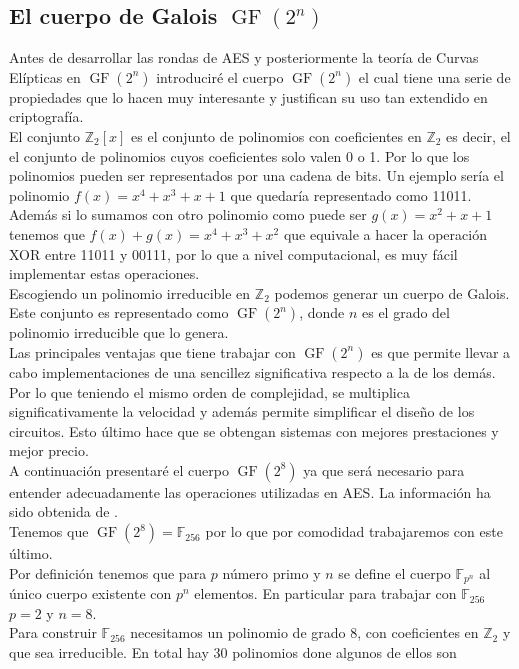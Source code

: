 \subsection{El cuerpo de Galois $\operatorname{GF}(2^n)$}
Antes de desarrollar las rondas de AES y posteriormente la teoría de Curvas Elípticas en $\operatorname{GF}(2^n)$ introduciré el cuerpo $\operatorname{GF}(2^n)$ el cual tiene una serie de propiedades que lo hacen muy interesante y justifican su uso tan extendido en criptografía.\\
El conjunto $\mathbb{Z}_2[x]$ es el conjunto de polinomios con coeficientes en $\mathbb{Z}_2$ es decir, el el conjunto de polinomios cuyos coeficientes solo valen 0 o 1. Por lo que los polinomios pueden ser representados por una cadena de bits.
 Un ejemplo sería el polinomio $f(x)=x^4+x^3+x+1$ que quedaría representado como 11011. 
Además si lo sumamos con otro polinomio como puede ser $g(x)=x^2+x+1$ tenemos que $f(x)+g(x)=x^4+x^3+x^2$ que equivale a hacer la operación XOR entre 11011 y 00111, por lo que a nivel computacional, es muy fácil implementar estas operaciones.\\
Escogiendo un polinomio irreducible en $\mathbb{Z}_2$ podemos generar un cuerpo de Galois. Este conjunto es representado como $\operatorname{GF}(2^n)$, donde $n$ es el grado del polinomio irreducible que lo genera.\\
Las principales ventajas que tiene trabajar con $\operatorname{GF}(2^n)$ es que permite llevar a cabo implementaciones de una sencillez significativa respecto a la de los demás. Por lo que teniendo el mismo orden de complejidad, se multiplica significativamente la velocidad y además permite simplificar el diseño de los circuitos. Esto último hace que se obtengan sistemas con mejores prestaciones y mejor precio.\\
A continuación presentaré el cuerpo $\operatorname{GF}(2^8)$ ya que será necesario para entender adecuadamente las operaciones utilizadas en AES. La información ha sido obtenida de \cite{criptografiaa}.\\
Tenemos que $\operatorname{GF}(2^8)=\mathbb{F}_{256}$ por lo que por comodidad trabajaremos con este último.\\
Por definición tenemos que para $p$ número primo y $n$ se define el cuerpo $\mathbb{F}_{p^n}$ al único cuerpo existente con $p^n$ elementos. En particular para trabajar con $\mathbb{F}_{256}$ $p=2$ y $n=8$.\\
Para construir $\mathbb{F}_{256}$ necesitamos un polinomio de grado 8, con coeficientes en $\mathbb{Z}_2$ y que sea irreducible. En total hay 30 polinomios done algunos de ellos son 
